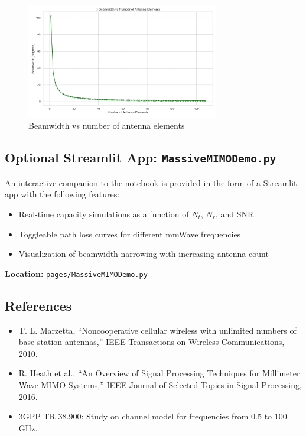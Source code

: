 \begin{figure}[H]
    \centering
    \includegraphics[width=0.75\textwidth]{figures/beamwidth_vs_elements.png}
    \caption{Beamwidth vs number of antenna elements}
\end{figure}

\subsection{Optional Streamlit App: \texttt{MassiveMIMODemo.py}}

An interactive companion to the notebook is provided in the form of a Streamlit app with the following features:

\begin{itemize}
    \item Real-time capacity simulations as a function of $N_t$, $N_r$, and SNR
    \item Toggleable path loss curves for different mmWave frequencies
    \item Visualization of beamwidth narrowing with increasing antenna count
\end{itemize}

\textbf{Location:} \texttt{pages/MassiveMIMODemo.py}

\subsection*{References}
\begin{itemize}
    \item T. L. Marzetta, “Noncooperative cellular wireless with unlimited numbers of base station antennas,” IEEE Transactions on Wireless Communications, 2010.
    \item R. Heath et al., “An Overview of Signal Processing Techniques for Millimeter Wave MIMO Systems,” IEEE Journal of Selected Topics in Signal Processing, 2016.
    \item 3GPP TR 38.900: Study on channel model for frequencies from 0.5 to 100 GHz.
\end{itemize}



